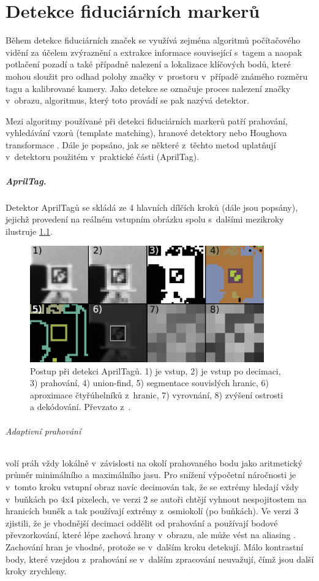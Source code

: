 \chapter{Detekce fiduciárních markerů} \label{chap:detection}
  Během detekce fiduciárních značek se využívá zejména algoritmů počítačového vidění za účelem zvýraznění a extrakce informace související s~tagem a naopak potlačení pozadí a také případně nalezení a lokalizace klíčových bodů, které mohou sloužit pro odhad polohy značky v~prostoru v~případě známého rozměru tagu a kalibrované kamery. Jako detekce se označuje proces nalezení značky v~obrazu, algoritmus, který toto provádí se pak nazývá detektor.

  Mezi algoritmy používané při detekci fiduciárních markerů patří prahování, vyhledávání vzorů (template matching), hranové detektory \cite{apriltag2} nebo Houghova transformace \cite{Shabalina2019}. Dále je popsáno, jak se některé z~těchto metod uplatňují v~detektoru použitém v~praktické části (AprilTag).

  \paragraph{AprilTag.} Detektor AprilTagů se skládá ze 4 hlavních dílčích kroků (dále jsou popsány), jejichž provedení na reálném vstupním obrázku spolu s~dalšími mezikroky ilustruje \cref{fig:apriltagAlg}.
\begin{figure}
  \centering
  \includegraphics[width=0.9\textwidth]{img/detection/apriltag_alg.png}
  \caption[Postup při detekci AprilTagů]{Postup při detekci AprilTagů. 1) je vstup, 2) je vstup po decimaci, 3) prahování, 4) union-find, 5) segmentace souvislých hranic, 6) aproximace čtyřúhelníků z~hranic, 7) vyrovnání, 8) zvýšení ostrosti a dekódování. Převzato z~\cite{apriltag3}.}
  \label{fig:apriltagAlg}
\end{figure}

  \subparagraph{Adaptivní prahování} volí práh vždy lokálně v~závislosti na okolí prahovaného bodu jako aritmetický průměr minimálního a maximálního jasu. Pro snížení výpočetní náročnosti je v~tomto kroku vstupní obraz navíc decimován tak, že se extrémy hledají vždy v~buňkách po 4x4 pixelech, ve verzi 2 \cite{apriltag2} se autoři chtějí vyhnout nespojitostem na hranicích buněk a tak používají extrémy z~osmiokolí (po buňkách). Ve verzi 3 zjistili, že je vhodnější decimaci oddělit od prahování a používají bodové převzorkování, které lépe zachová hrany v~obrazu, ale může vést na aliasing \cite{apriltag3}. Zachování hran je vhodné, protože se v~dalším kroku detekují. Málo kontrastní body, které vzejdou z~prahování se v~dalším zpracování neuvažují, čímž jsou další kroky zrychleny.


